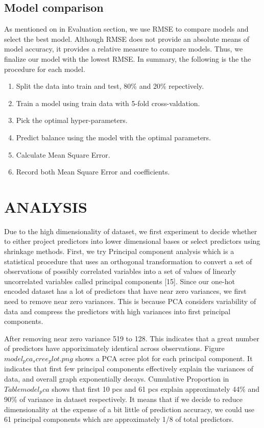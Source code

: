 \documentclass[letterpaper, 10 pt, conference]{ieeeconf}  %
\begin{document}
\subsection{Model comparison}
As mentioned on in Evaluation section, we use RMSE to compare models and select the best model. Although RMSE does not provide an absolute means of model accuracy, it provides a relative measure to compare models. Thus, we finalize our model with the lowest RMSE.
In summary, the following is the the procedure for each model.

\begin{enumerate}
\item Split the data into train and test, 80\% and 20\% repectively.
\item Train a model using train data with 5-fold cross-valdation.
\item Pick the optimal hyper-parameters.
\item Predict balance using the model with the optimal parameters.
\item Calculate Mean Square Error.
\item Record both Mean Square Error and coefficients.
\end{enumerate}

\section{ANALYSIS}
Due to the high dimensionality of dataset, we first experiment to decide whether to either project predictors into lower dimensional bases or select predictors using shrinkage methods. First, we try Principal component analysis which is a statistical procedure that uses an orthogonal transformation to convert a set of observations of possibly correlated variables into a set of values of linearly uncorrelated variables called principal components [15]. Since our one-hot encoded dataset has a lot of predictors that have near zero variances, we first need to remove near zero variances. This is because PCA considers variability of data and compress the predictors with high variances into first principal components.   

After removing near zero variance 519 to 128. This indicates that a great number of predictors have apporiximately identical across observations. Figure $model_pca_scree_plot.png$ shows a PCA scree plot for each principal component. It indicates that first few principal components effectively explain the variances of data, and overall graph exponentially decays. Cumulative Proportion in $Table model_pca$ shows that first 10 pcs and 61 pcs explain approximately 44\% and 90\% of variance in dataset respectively. It means that if we decide to reduce dimensionality at the expense of a bit little of prediction accuracy, we could use 61 principal components which are approximately 1/8 of total predictors. 
\end{document}

